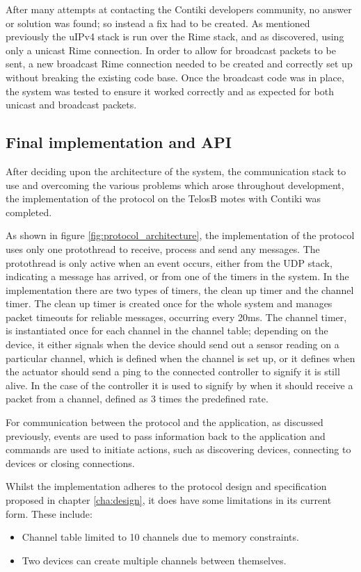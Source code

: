 After many attempts at contacting the Contiki developers community, no answer or solution was found; so instead a fix had to be created. As mentioned previously the uIPv4 stack is run over the Rime stack, and as discovered, using only a unicast Rime connection. In order to allow for broadcast packets to be sent, a new broadcast Rime connection needed to be created and correctly set up without breaking the existing code base. Once the broadcast code was in place, the system was tested to ensure it worked correctly and as expected for both unicast and broadcast packets.


\subsection{Final implementation and API}
After deciding upon the architecture of the system, the communication stack to use and overcoming the various problems which arose throughout development, the implementation of the protocol on the TelosB motes with Contiki was completed. 

As shown in figure \ref{fig:protocol_architecture}, the implementation of the protocol uses only one protothread to receive, process and send any messages. The protothread is only active when an event occurs, either from the UDP stack, indicating a message has arrived, or from one of the timers in the system. In the implementation there are two types of timers, the clean up timer and the channel timer. The clean up timer is created once for the whole system and manages packet timeouts for reliable messages, occurring every 20ms. The channel timer, is instantiated once for each channel in the channel table; depending on the device, it either signals when the device should send out a sensor reading on a particular channel, which is defined when the channel is set up, or it defines when the actuator should send a ping to the connected controller to signify it is still alive. In the case of the controller it is used to signify by when it should receive a packet from a channel, defined as 3 times the predefined rate.

For communication between the protocol and the application, as discussed previously, events are used to pass information back to the application and commands are used to initiate actions, such as discovering devices, connecting to devices or closing connections.

Whilst the implementation adheres to the protocol design and specification proposed in chapter \ref{cha:design}, it does have some limitations in its current form. These include:
\begin{itemize}
 	\item Channel table limited to 10 channels due to memory constraints.
 	\item Two devices can create multiple channels between themselves. 
 \end{itemize} 



